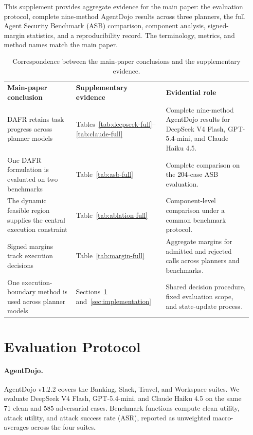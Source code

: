 \documentclass[letterpaper]{article}
\begin{document}
This supplement provides aggregate evidence for the main paper: the evaluation protocol, complete nine-method AgentDojo results across three planners, the full Agent Security Benchmark (ASB) comparison, component analysis, signed-margin statistics, and a reproducibility record. The terminology, metrics, and method names match the main paper.

\begin{table}[t]
\centering
\small
\begin{tabular}{>{\raggedright\arraybackslash}p{}>{\raggedright\arraybackslash}p{}>{\raggedright\arraybackslash}p{}}
\toprule
Main-paper conclusion & Supplementary evidence & Evidential role\\
\midrule
DAFR retains task progress across planner models & Tables~\ref{tab:deepseek-full}--\ref{tab:claude-full} & Complete nine-method AgentDojo results for DeepSeek V4 Flash, GPT-5.4-mini, and Claude Haiku 4.5.\\
One DAFR formulation is evaluated on two benchmarks & Table~\ref{tab:asb-full} & Complete comparison on the 204-case ASB evaluation.\\
The dynamic feasible region supplies the central execution constraint & Table~\ref{tab:ablation-full} & Component-level comparison under a common benchmark protocol.\\
Signed margins track execution decisions & Table~\ref{tab:margin-full} & Aggregate margins for admitted and rejected calls across planners and benchmarks.\\
One execution-boundary method is used across planner models & Sections~\ref{sec:protocol} and~\ref{sec:implementation} & Shared decision procedure, fixed evaluation scope, and state-update process.\\
\bottomrule
\end{tabular}
\caption{Correspondence between the main-paper conclusions and the supplementary evidence.}
\label{tab:evidence-map}
\end{table}

\section{Evaluation Protocol}
\label{sec:protocol}

\paragraph{AgentDojo.}
AgentDojo v1.2.2 covers the Banking, Slack, Travel, and Workspace suites. We evaluate DeepSeek V4 Flash, GPT-5.4-mini, and Claude Haiku 4.5 on the same 71 clean and 585 adversarial cases. Benchmark functions compute clean utility, attack utility, and attack success rate (ASR), reported as unweighted macro-averages across the four suites.
\end{document}
